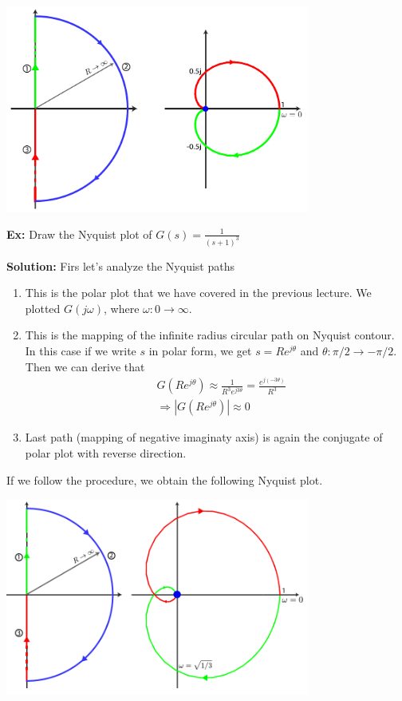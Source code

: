 \documentclass{article}
\begin{document}
  \begin{minipage}[h]{1\linewidth}
    \begin{center}
      \includegraphics[width=0.75\textwidth]{ex3}
    \end{center}
  \end{minipage}

\vspace{12 pt}

\textbf{Ex:} Draw the Nyquist plot of $G(s) =
\frac{1}{(s+1)^3}$ 

\textbf{Solution:} Firs let's analyze the Nyquist paths
%
\begin{enumerate}

  \item This is the polar plot that we have covered in the previous
    lecture. We plotted $G(j \omega)$, where $\omega : 0 \to
    \infty$. 
  \item This is the mapping of the infinite radius circular path on
    Nyquist contour. In this case if we write $s$ in polar form, we
    get $s = R e^{j \theta}$ and $\theta : \pi/2 \to -\pi/2$.  Then 
   we can derive that  
   \begin{align*}
     & G \left( R e^{j \theta} \right) \approx \frac{1}{R^3 e^{j
       3 \theta}} = \frac{e^{j (-3 \theta)}}{R^3}
       \\
    &\Rightarrow | G \left( R e^{j \theta} \right) | \approx 0
   \end{align*}
   \item Last path (mapping of negative imaginaty axis) is again
   the conjugate of polar plot with reverse direction. 
\end{enumerate}

If we follow the procedure, we obtain the following Nyquist plot. 

\vspace{6 pt}

  \begin{minipage}[h]{1\linewidth}
    \begin{center}
      \includegraphics[width=0.75\textwidth]{ex4}
    \end{center}
  \end{minipage}

 
\end{document}

